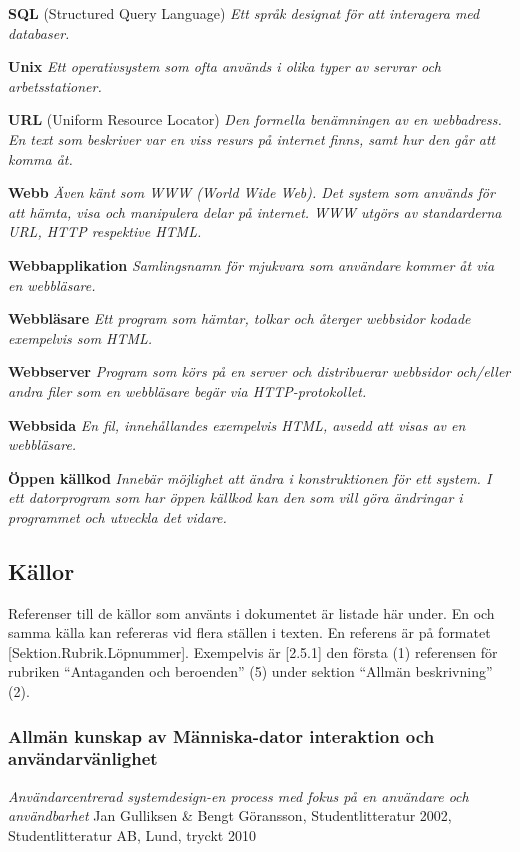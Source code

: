 \documentclass[a4paper, twoside, 11pt, titlepage]{article}
\begin{document}
	\textbf{SQL} (Structured Query Language) \emph{Ett språk designat för att interagera med databaser.}

	\textbf{Unix} \emph{Ett operativsystem som ofta används i olika typer av servrar och arbetsstationer.}

	\textbf{URL} (Uniform Resource Locator) \emph{Den formella benämningen av en webbadress. En text som beskriver var en viss resurs på internet finns, samt hur den går att komma åt.}

	\textbf{Webb} \emph{Även känt som WWW (World Wide Web). Det system som används för att hämta, visa och manipulera delar på internet. WWW utgörs av standarderna URL, HTTP respektive HTML.}

	\textbf{Webbapplikation} \emph{Samlingsnamn för mjukvara som användare kommer åt via en webbläsare.}

	\textbf{Webbläsare} \emph{Ett program som hämtar, tolkar och återger webbsidor kodade exempelvis som HTML.}

	\textbf{Webbserver} \emph{Program som körs på en server och distribuerar webbsidor och/eller andra filer som en webbläsare begär via HTTP-protokollet.}

	\textbf{Webbsida} \emph{En fil, innehållandes exempelvis HTML, avsedd att visas av en webbläsare.}

	\textbf{Öppen källkod} \emph{Innebär möjlighet att ändra i konstruktionen för ett system. I ett datorprogram som har öppen källkod kan den som vill göra ändringar i programmet och utveckla det vidare.}

	\subsection{Källor}


	Referenser till de källor som använts i dokumentet är listade här under. En och samma källa kan refereras vid flera ställen i texten. En referens är på formatet [Sektion.Rubrik.Löpnummer]. Exempelvis är [2.5.1] den första (1) referensen för rubriken ``Antaganden och beroenden'' (5) under sektion ``Allmän beskrivning'' (2).

		\subsubsection{Allmän kunskap av Människa-dator interaktion och användarvänlighet}


		\emph{Användarcentrerad systemdesign-en process med fokus på en användare och användbarhet} Jan Gulliksen \& Bengt Göransson, Studentlitteratur 2002, Studentlitteratur AB, Lund, tryckt 2010
\end{document}
